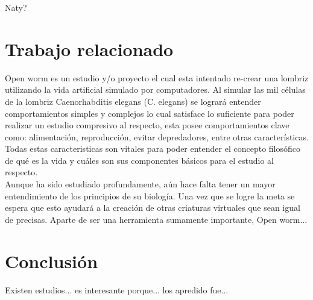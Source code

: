 \documentclass[conference]{IEEEtran}
\begin{document}
Naty? 

\section{Trabajo relacionado}

Open worm es un estudio y/o proyecto el cual esta intentado re-crear una lombriz utilizando la vida artificial simulado por computadores.  Al simular las mil c\'elulas de la lombriz Caenorhabditis elegans (C. elegans) se lograr\'a entender comportamientos simples y complejos lo cual satisface lo suficiente para poder realizar un estudio compresivo al respecto, esta posee comportamientos clave como: alimentaci\'on, reproducci\'on, evitar depredadores, entre otras caracter\'isticas. \cite{openworm} Todas estas caracteristicas son vitales para poder entender el concepto filos\'ofico de qu\'e es la vida y cu\'ales son sus componentes b\'asicos para el estudio al respecto. \\
Aunque ha sido estudiado profundamente, a\'un hace falta tener un mayor entendimiento de los principios de su biolog\'ia.
Una vez que se logre la meta se espera que esto ayudar\'a a la creaci\'on de otras criaturas virtuales que sean igual de precisas.
Aparte de ser una herramienta sumamente importante, Open worm... %

\section{Conclusi\'on}

Existen estudios... es interesante porque... los apredido fue...

\nocite{*}


\end{document}

